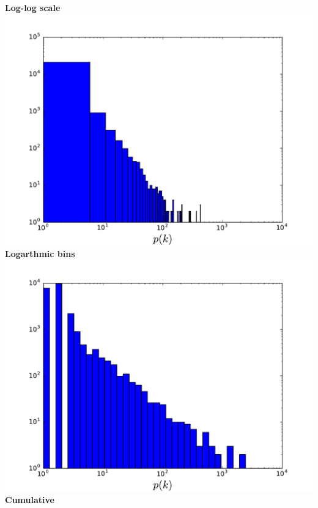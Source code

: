 \documentclass{beamer}
\begin{document}
\begin{frame}
    \vspace{2em}
    \begin{columns}
        \centering
        {\bf Log-log scale}
        \includegraphics[width=\columnwidth]{internet_loglog_hist.pdf}
        \centering
        {\bf Logarthmic bins}
        \includegraphics[width=\columnwidth]{internet_loglog_logbin_hist.pdf}
        \centering
        {\bf Cumulative }

\end{columns}
\end{frame}
\end{document}
